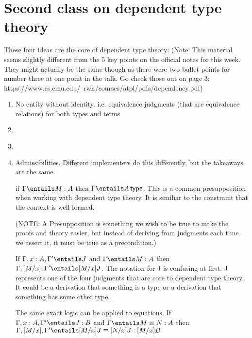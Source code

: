 \documentclass[11pt]{article}
\begin{document}
\section*{Second class on dependent type theory}
These four ideas are the core of dependent type theory: (Note: This material seems slightly different from the 5 key points on the official notes for this week. They might actually be the same though as there were two bullet points for number three at one point in the talk. Go check those out on page 3: https://www.cs.cmu.edu/~rwh/courses/atpl/pdfs/dependency.pdf)
\begin{enumerate}
    \item No entity without identity. i.e. equivalence judgments (that are equivalence relations) for both types and terms
    \item
    \begin{mathpar}
    \end{mathpar}
    \item
    \begin{mathpar}

    \end{mathpar}
    \item Admissibilities. Different implementers do this differently, but the takeaways are the same.

    if $\Gamma \entails M : A$ then $\Gamma \entails \isTp{A}$. This is a common presupposition when working with dependent type theory. It is similiar to the constraint that the context is well-formed.

    (NOTE: A Presupposition is something we wish to be true to make the proofs and theory easier, but instead of deriving from judgments each time we assert it, it must be true as a precondition.)

    If $\Gamma, x : A, \Gamma' \entails J$ and $\Gamma \entails M : A$ then $\Gamma, [M / x], \Gamma' \entails [M/x]J$. The notation for J is confusing at first. J represents one of the four judgments that are core to dependent type theory. It could be a derivation that something is a type or a derivation that something has some other type.

    The same exact logic can be applied to equations. If $\Gamma, x : A, \Gamma' \entails J : B$ and $\Gamma \entails M \equiv N : A$ then $\Gamma, [M / x], \Gamma' \entails [M / x] J \equiv [N / x] J: [M/x]B$

\end{enumerate}
\end{document}
